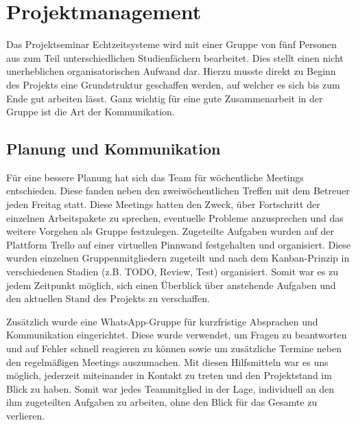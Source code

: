 \section{Projektmanagement}
\label{sec:projektmanagement}
Das Projektseminar Echtzeitsysteme wird mit einer Gruppe von f\"unf Personen aus zum Teil unterschiedlichen Studienf\"achern bearbeitet. Dies stellt einen nicht unerheblichen organisatorischen Aufwand dar. Hierzu musste direkt zu Beginn des Projekts eine Grundstruktur geschaffen werden, auf welcher es sich bis zum Ende gut arbeiten l\"asst. Ganz wichtig f\"ur eine gute Zusammenarbeit in der Gruppe ist die Art der Kommunikation.

\subsection{Planung und Kommunikation}
F\"ur eine bessere Planung hat sich das Team f\"ur w\"ochentliche Meetings entschieden. Diese fanden neben den zweiw\"ochentlichen Treffen mit dem Betreuer jeden Freitag statt. Diese Meetings hatten den Zweck, \"uber Fortschritt der einzelnen Arbeitspakete zu sprechen, eventuelle Probleme anzusprechen und das weitere Vorgehen als Gruppe festzulegen. Zugeteilte Aufgaben wurden auf der Plattform Trello auf einer virtuellen Pinnwand festgehalten und organisiert. Diese wurden einzelnen Gruppenmitgliedern zugeteilt und nach dem Kanban-Prinzip in verschiedenen Stadien (z.B. TODO, Review, Test) organisiert. Somit war es zu jedem Zeitpunkt m\"oglich, sich einen \"Uberblick \"uber anstehende Aufgaben und den aktuellen Stand des Projekts zu verschaffen.

Zus\"atzlich wurde eine WhatsApp-Gruppe f\"ur kurzfristige Absprachen und Kommunikation eingerichtet. Diese wurde verwendet, um Fragen zu beantworten und auf Fehler schnell reagieren zu k\"onnen sowie um zus\"atzliche Termine neben den regelm\"a\ss igen Meetings auszumachen. Mit diesen Hilfsmitteln war es uns m\"oglich, jederzeit miteinander in Kontakt zu treten und den Projektstand im Blick zu haben. Somit war jedes Teammitglied in der Lage, individuell an den ihm zugeteilten Aufgaben zu arbeiten, ohne den Blick f\"ur das Gesamte zu verlieren.

